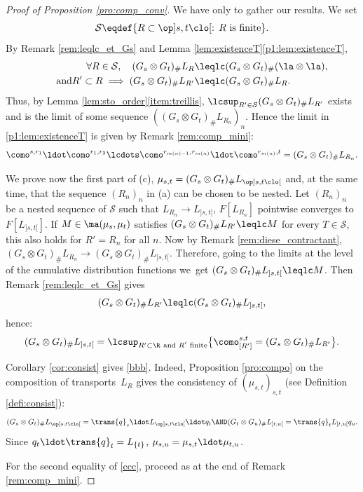 \begin{proof}[Proof of Proposition \ref{pro:comp_conv}] We have only to gather our results. We set
\[
\mathcal{S}\eqdef\{R\subset \op]s,t\clo[:\,R\text{ is finite}\}.
\]
By Remark \ref{rem:leqlc_et_Gs} and Lemma \ref{lem:existenceT}\eqref{p1:lem:existenceT},
\begin{align*}
\forall R\in\mathcal{S},\quad (G_s\otimes G_t)_\#L_R&\leqlc (G_s\otimes G_t)_\#(\la\otimes \la),\\
\tag*{and}
R'\subset R\implies(G_s\otimes G_t)_\#L_{R'}&\leqlc (G_s\otimes G_t)_\#L_{R}. 
\end{align*}
Thus, by Lemma \ref{lem:sto_order}\eqref{item:treillis}, $\lcsup_{R'\in\mathcal{S}}(G_s\otimes G_t)_\#L_{R'}$ exists and is the limit of some sequence $((G_s\otimes G_t)_\#L_{R_n})_n$. Hence the limit in \eqref{p1:lem:existenceT} is given by Remark \ref{rem:comp_mini}:
\[\como^{s,r_1}{}\ldot\como^{r_1,r_2}\lcdots \como^{r_{m(n)-1},r_{m(n)}}{}\ldot\como^{r_{m(n)},t}=(G_s\otimes G_t)_\#L_{R_n}.\]

We prove now the first part of (c), \ie $\mu_{s,t}=(G_s\otimes G_t)_\#L_{\op]s,t\clo[}$ and, at the same time, that the sequence $(R_n)_n$ in (a) can be chosen to be nested. Let $(R_n)_n$ be a nested sequence of $\mathcal{S}$ such that $L_{R_n}\to L_{]s,t[}$, \ie $F[L_{R_n}]$ pointwise converges to $F[L_{]s,t[}]$. If $M\in \ma(\mu_s,\mu_t)$ satisfies $(G_s\otimes G_t)_\#L_{R'}\leqlc M$ for every $T\in \mathcal{S}$, this also holds for $R'=R_n$ for all $n$. Now by Remark \ref{rem:diese_contractant}, $(G_s\otimes G_t)_\#L_{R_n}\to (G_s\otimes G_t)_\#L_{]s,t[}$. Therefore, going to the limits at the level of the cumulative distribution functions we~get $(G_s\otimes G_t)_\#L_{]s,t[}\leqlc M$. Then Remark \ref{rem:leqlc_et_Gs} gives
\[
(G_s\otimes G_t)_\#L_{R'}\leqlc(G_s\otimes G_t)_\#L_{]s,t[},
\]
hence:
\[(G_s\otimes G_t)_\#L_{]s,t[}=\lcsup_{R'\subset\R\ \text{and $R'$ finite}}\bigl\{\como^{s,t}_{[R']}=(G_s\otimes G_t)_\#L_{R'}\bigr\}.\]

Corollary \ref{cor:consist} gives \eqref{bbb}. Indeed, Proposition \ref{pro:compo} on the composition of transports~$L_R$ gives the consistency of $(\mu_{s,t})_{s,t}$ (see Definition \ref{defi:consist}):
\[
(G_s\otimes G_t)_\#L_{\op]s,t\clo[}=\trans{q}_s \ldot L_{\op]s,t\clo[}{}\ldot q_t\AND (G_t\otimes G_u)_\#L_{]t,u[}=\trans{q}_t L_{]t,u[}q_u.
\]
Since $q_t\ldot\trans{q}_t=L_{\{t\}}$, $\mu_{s,u}=\mu_{s,t}{}\ldot\mu_{t,u}$.

For the second equality of \eqref{ccc}, proceed as at the end of Remark \ref{rem:comp_mini}.
\end{proof}

